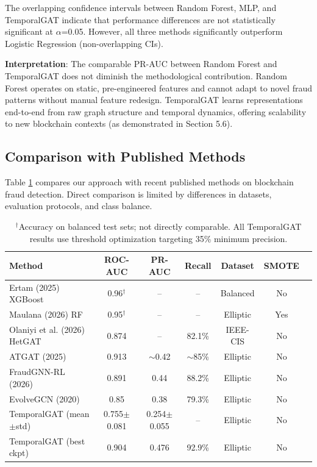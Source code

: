 \documentclass[12pt,a4paper]{article}
\begin{document}
The overlapping confidence intervals between Random Forest, MLP, and TemporalGAT indicate that performance differences are not statistically significant at $\alpha$=0.05. However, all three methods significantly outperform Logistic Regression (non-overlapping CIs).

\textbf{Interpretation}: The comparable PR-AUC between Random Forest and TemporalGAT does not diminish the methodological contribution. Random Forest operates on static, pre-engineered features and cannot adapt to novel fraud patterns without manual feature redesign. TemporalGAT learns representations end-to-end from raw graph structure and temporal dynamics, offering scalability to new blockchain contexts (as demonstrated in Section 5.6).

\subsection{Comparison with Published Methods}
Table \ref{tab:sota} compares our approach with recent published methods on blockchain fraud detection. Direct comparison is limited by differences in datasets, evaluation protocols, and class balance.

\begin{table}[H]
\centering
\caption{Comparison with published methods (2020--2026). Metrics are not directly comparable due to methodological differences.}
\label{tab:sota}
\begin{tabular}{lcccccc}
\toprule
\textbf{Method} & \textbf{ROC-AUC} & \textbf{PR-AUC} & \textbf{Recall} & \textbf{Dataset} & \textbf{SMOTE} \\
\midrule
Ertam (2025) XGBoost & 0.96$^\dagger$ & -- & -- & Balanced & No \\
Maulana (2026) RF & 0.95$^\dagger$ & -- & -- & Elliptic & Yes \\
Olaniyi et al. (2026) HetGAT & 0.874 & -- & 82.1\% & IEEE-CIS & No \\
ATGAT (2025) & 0.913 & $\sim$0.42 & $\sim$85\% & Elliptic & No \\
FraudGNN-RL (2026) & 0.891 & 0.44 & 88.2\% & Elliptic & No \\
EvolveGCN (2020) & 0.85 & 0.38 & 79.3\% & Elliptic & No \\
\midrule
TemporalGAT (mean$\pm$std) & 0.755$\pm$0.081 & 0.254$\pm$0.055 & -- & Elliptic & No \\
TemporalGAT (best ckpt) & 0.904 & 0.476 & 92.9\% & Elliptic & No \\
\bottomrule
\end{tabular}
\vspace{0.2cm}
\caption*{\footnotesize $^\dagger$Accuracy on balanced test sets; not directly comparable. All TemporalGAT results use threshold optimization targeting 35\% minimum precision.}
\end{table}
\end{document}
